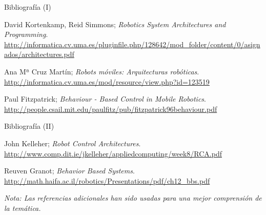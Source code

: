 \documentclass{beamer}
\begin{document}
\begin{thebibliography}{9}

\begin{frame}{Bibliografía (I)}

David Kortenkamp, Reid Simmons;
\emph{Robotics System Architectures and Programming}.\\
\url{http://informatica.cv.uma.es/pluginfile.php/128642/mod_folder/content/0/asignados/architectures.pdf}

Ana Mª Cruz Martín;
\emph{Robots móviles: Arquitecturas robóticas}.\\
\url{http://informatica.cv.uma.es/mod/resource/view.php?id=123519}

Paul Fitzpatrick;
\emph{Behaviour - Based Control in Mobile Robotics}.\\
\url{http://people.csail.mit.edu/paulfitz/pub/fitzpatrick96behaviour.pdf}

\end{frame}

\begin{frame}{Bibliografía (II)}

John Kelleher;
\emph{Robot Control Architectures}.\\
\url{http://www.comp.dit.ie/jkelleher/appliedcomputing/week8/RCA.pdf}

Reuven Granot;
\emph{Behavior Based Systems}.\\
\url{http://math.haifa.ac.il/robotics/Presentations/pdf/ch12_bbs.pdf}

\vspace{2em}

\emph{Nota: Las referencias adicionales han sido usadas para una mejor comprensión de la temática.}

\end{frame}

\end{thebibliography}
\end{document}
